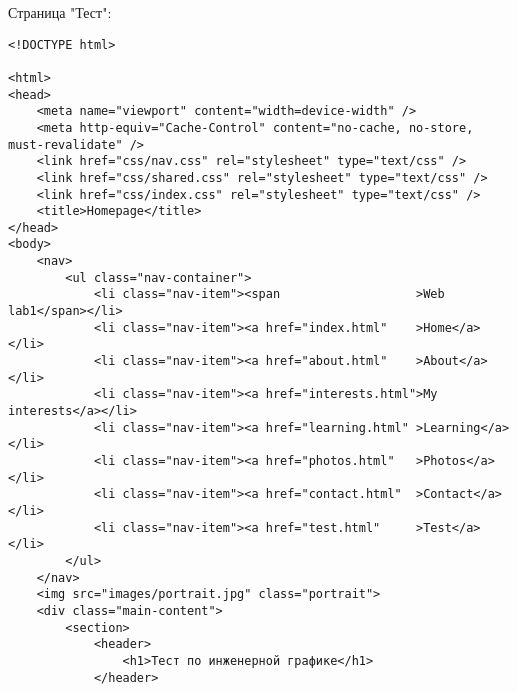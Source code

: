 Страница "Тест":
\begin{lstlisting}
<!DOCTYPE html>

<html>
<head>
    <meta name="viewport" content="width=device-width" />
    <meta http-equiv="Cache-Control" content="no-cache, no-store, must-revalidate" />
    <link href="css/nav.css" rel="stylesheet" type="text/css" />
    <link href="css/shared.css" rel="stylesheet" type="text/css" />
    <link href="css/index.css" rel="stylesheet" type="text/css" />
    <title>Homepage</title>
</head>
<body>
    <nav>
        <ul class="nav-container">
            <li class="nav-item"><span                   >Web lab1</span></li>
            <li class="nav-item"><a href="index.html"    >Home</a></li>
            <li class="nav-item"><a href="about.html"    >About</a></li>
            <li class="nav-item"><a href="interests.html">My interests</a></li>
            <li class="nav-item"><a href="learning.html" >Learning</a></li>
            <li class="nav-item"><a href="photos.html"   >Photos</a></li>
            <li class="nav-item"><a href="contact.html"  >Contact</a></li>
            <li class="nav-item"><a href="test.html"     >Test</a></li>
        </ul>
    </nav>
    <img src="images/portrait.jpg" class="portrait">
    <div class="main-content">
        <section>   
            <header>
                <h1>Тест по инженерной графике</h1>
            </header>


\end{lstlisting}
